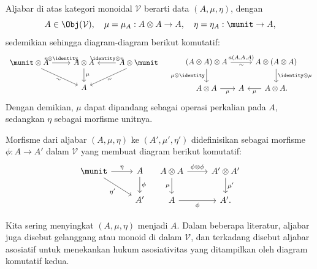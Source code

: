 \begin{definisi}[Aljabar]\label{def:algebra-monoidal}
	Aljabar di atas kategori monoidal $\mathcal{V}$ berarti data
	$(A,\mu,\eta)$, dengan
	\[ A \in \Obj(\mathcal{V}), \quad \mu = \mu_A: A \otimes A \to A, \quad \eta = \eta_A: \munit \to A, \]
	sedemikian sehingga diagram-diagram berikut komutatif:
	\begin{equation*}\begin{gathered}
		\begin{tikzcd}
			\munit \otimes A \arrow[r, "{\eta \otimes \identity}"] \arrow[rd, "\sim"' sloped] & A \otimes A \arrow[d, "\mu"] & A \otimes \munit \arrow[l, "{\identity \otimes \eta}"'] \arrow[ld, "\sim"' sloped] \\
			& A &
		\end{tikzcd} \quad
		\begin{tikzcd}[column sep=tiny]
			(A \otimes A) \otimes A \arrow[rr, "{a(A, A, A)}", "\sim"'] \arrow[d, "{\mu \otimes \identity}"'] & & A \otimes (A \otimes A) \arrow[d, "{\identity \otimes \mu}"] \\
			A \otimes A \arrow[r, "\mu"'] & A & A \otimes A \arrow[l, "\mu"] .
		\end{tikzcd}
	\end{gathered}\end{equation*}
	Dengan demikian, $\mu$ dapat dipandang sebagai operasi perkalian pada $A$,
	sedangkan $\eta$ sebagai morfisme unitnya.
	
	Morfisme dari aljabar $(A,\mu,\eta)$ ke $(A',\mu',\eta')$ didefinisikan
	sebagai morfisme $\phi:A\to A'$ dalam $\mathcal{V}$ yang membuat diagram
	berikut komutatif:
	\[\begin{tikzcd}
		\munit \arrow[r, "\eta"] \arrow[rd, "{\eta'}"'] & A \arrow[d, "\phi"] \\
		& A'
	\end{tikzcd} \quad \begin{tikzcd}
		A \otimes A \arrow[d, "\mu"'] \arrow[r, "{\phi \otimes \phi}"] & A' \otimes A' \arrow[d, "{\mu'}"] \\
		A \arrow[r, "\phi"'] & A' .
	\end{tikzcd}\]
\end{definisi}

Kita sering menyingkat $(A,\mu,\eta)$ menjadi $A$. Dalam beberapa literatur,
aljabar juga disebut gelanggang atau monoid di dalam $\mathcal{V}$, dan
terkadang disebut aljabar asosiatif untuk menekankan hukum asosiativitas yang
ditampilkan oleh diagram komutatif kedua.

